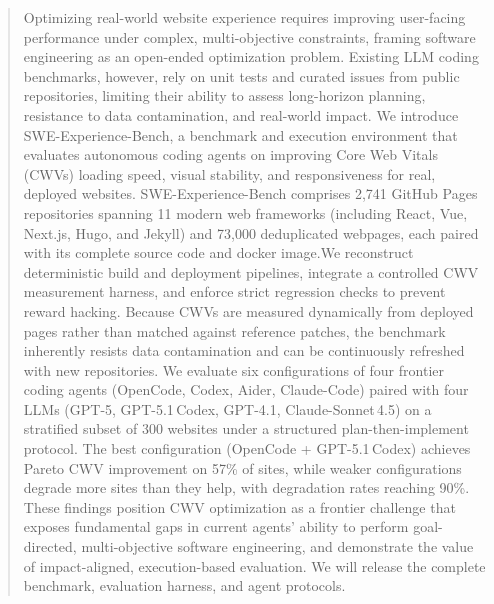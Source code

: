 \documentclass[sigconf,anonymous,review]{acmart}
\begin{document}
\begin{abstract}
Optimizing real-world website experience requires improving user-facing performance under complex, multi-objective constraints, framing software engineering as an open-ended optimization problem. Existing LLM coding benchmarks, however, rely on unit tests and curated issues from public repositories, limiting their ability to assess long-horizon planning, resistance to data contamination, and real-world impact. We introduce SWE-Experience-Bench, a benchmark and execution environment that evaluates autonomous coding agents on improving Core Web Vitals (CWVs) loading speed, visual stability, and responsiveness for real, deployed websites. SWE-Experience-Bench comprises 2{,}741 GitHub Pages repositories spanning 11 modern web frameworks (including React, Vue, Next.js, Hugo, and Jekyll) and 73{,}000 deduplicated webpages, each paired with its complete source code and docker image.We reconstruct deterministic build and deployment pipelines, integrate a controlled CWV measurement harness, and enforce strict regression checks to prevent reward hacking. Because CWVs are measured dynamically from deployed pages rather than matched against reference patches, the benchmark inherently resists data contamination and can be continuously refreshed with new repositories. We evaluate six configurations of four frontier coding agents (OpenCode, Codex, Aider, Claude-Code) paired with four LLMs (GPT-5, GPT-5.1\,Codex, GPT-4.1, Claude-Sonnet\,4.5) on a stratified subset of 300 websites under a structured plan-then-implement protocol. The best configuration (OpenCode + GPT-5.1\,Codex) achieves Pareto CWV improvement on 57\% of sites, while weaker configurations degrade more sites than they help, with degradation rates reaching 90\%. These findings position CWV optimization as a frontier challenge that exposes fundamental gaps in current agents' ability to perform goal-directed, multi-objective software engineering, and demonstrate the value of impact-aligned, execution-based evaluation. We will release the complete benchmark, evaluation harness, and agent protocols.



\end{abstract}
\end{document}
